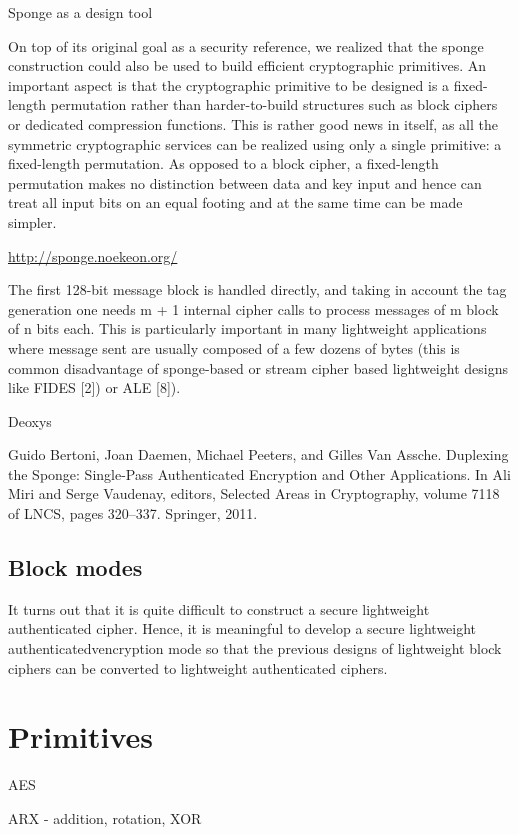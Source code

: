 Sponge as a design tool

On top of its original goal as a security reference, we realized that the sponge construction could also be used to build efficient cryptographic primitives. An important aspect is that the cryptographic primitive to be designed is a fixed-length permutation rather than harder-to-build structures such as block ciphers or dedicated compression functions. This is rather good news in itself, as all the symmetric cryptographic services can be realized using only a single primitive: a fixed-length permutation. As opposed to a block cipher, a fixed-length permutation makes no distinction between data and key input and hence can treat all input bits on an equal footing and at the same time can be made simpler.

\url{http://sponge.noekeon.org/}

The first 128-bit message block is handled directly, and taking in account the tag generation one needs m + 1 internal cipher calls to process messages of m block of n bits each. This is particularly important in many lightweight applications where message sent are usually composed of a few dozens of bytes (this is common disadvantage of sponge-based or stream cipher based lightweight designs like FIDES [2]) or ALE [8]).

Deoxys

Guido Bertoni, Joan Daemen, Michael Peeters, and Gilles Van Assche. Duplexing the Sponge: Single-Pass
Authenticated Encryption and Other Applications. In Ali Miri and Serge Vaudenay, editors, Selected Areas
in Cryptography, volume 7118 of LNCS, pages 320–337. Springer, 2011.

\subsection{Block modes}

It turns out that it is quite difficult to construct a secure lightweight authenticated cipher. Hence, it is meaningful to develop a secure lightweight authenticatedvencryption mode so that the previous designs of lightweight block ciphers can be converted to lightweight authenticated ciphers.

\section{Primitives}

AES

ARX - addition, rotation, XOR

